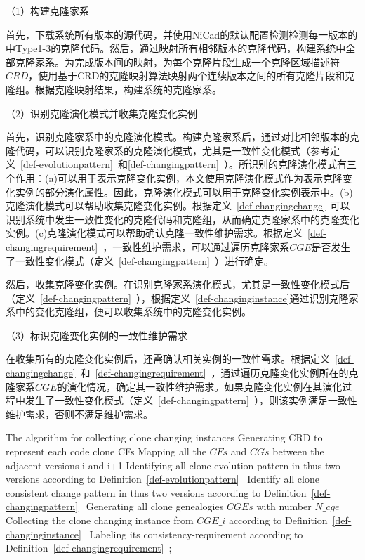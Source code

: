（1）构建克隆家系

首先，下载系统所有版本的源代码，并使用NiCad的默认配置检测检测每一版本的中Type1-3的克隆代码。然后，通过映射所有相邻版本的克隆代码，构建系统中全部克隆家系。为完成版本间的映射，为每个克隆片段生成一个克隆区域描述符 $CRD$\cite{duala2010clone}，使用基于CRD的克隆映射算法映射两个连续版本之间的所有克隆片段和克隆组\cite{ci2013new}\cite{ci2013newD}。根据克隆映射结果，构建系统的克隆家系。

（2）识别克隆演化模式并收集克隆变化实例

首先，识别克隆家系中的克隆演化模式。构建克隆家系后，通过对比相邻版本的克隆代码，可以识别克隆家系的克隆演化模式，尤其是一致性变化模式（参考定义~\ref{def-evolutionpattern}~和\ref{def-changingpattern}~）。所识别的克隆演化模式有三个作用：(a)可以用于表示克隆变化实例，本文使用克隆演化模式作为表示克隆变化实例的部分演化属性。因此，克隆演化模式可以用于克隆变化实例表示中。(b)克隆演化模式可以帮助收集克隆变化实例。根据定义~\ref{def-changingchange}~可以识别系统中发生一致性变化的克隆代码和克隆组，从而确定克隆家系中的克隆变化实例。(c)克隆演化模式可以帮助确认克隆一致性维护需求。根据定义~\ref{def-changingrequirement}~，一致性维护需求，可以通过遍历克隆家系$CGE$是否发生了一致性变化模式（定义~\ref{def-changingpattern}~）进行确定。

然后，收集克隆变化实例。在识别克隆家系演化模式，尤其是一致性变化模式后（定义~\ref{def-changingpattern}~），根据定义~\ref{def-changinginstance}通过识别克隆家系中的变化克隆组，便可以收集系统中的克隆变化实例。

（3）标识克隆变化实例的一致性维护需求

在收集所有的克隆变化实例后，还需确认相关实例的一致性需求。根据定义~\ref{def-changingchange}~和~\ref{def-changingrequirement}~，通过遍历克隆变化实例所在的克隆家系$CGE$的演化情况，确定其一致性维护需求。如果克隆变化实例在其演化过程中发生了一致性变化模式（定义~\ref{def-changingpattern}~），则该实例满足一致性维护需求，否则不满足维护需求。

\begin{minipage}{0.8\textwidth}
\centering
\begin{algorithm}[H]
 {The algorithm for collecting clone changing instances}
\label{alg-collectionchanging}
{ 
 Generating CRD to represent each code clone {CFs}\;
 Mapping all the $CFs$ and $CGs$ between the adjacent versions {i} and {i+1}\;
 Identifying all clone evolution pattern in thus two versions according to Definition~\ref{def-evolutionpattern}~\;
 Identify all clone consistent change pattern in thus two versions according to Definition~\ref{def-changingpattern}~\;
}
Generating all clone genealogies $CGEs$ with number $N\_cge$\;
{ 
 Collecting the clone changing instance from $CGE\_i$ according to Definition~\ref{def-changinginstance}~\; 
 Labeling its consistency-requirement according to Definition~\ref{def-changingrequirement}~;
}
\end{algorithm}
\end{minipage}

